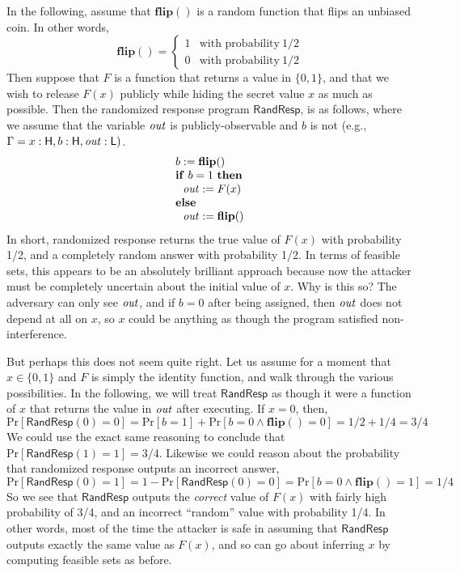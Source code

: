 \documentclass[11pt]{article}
\newcommand{\pr}{\mathrm{Pr}}
\newcommand{\flip}{\mathbf{flip}}
\begin{document}
In the following, assume that $\flip()$ is a random function that flips
an unbiased coin. In other words,
\[
\flip() =
\left\{
\begin{array}{ll}
%
1 & \mbox{with probability}\ 1/2 \\
0 & \mbox{with probability}\ 1/2
\end{array}
\right.
\]
Then suppose that $F$ is a function that returns a value in $\{0,1\}$,
and that we wish to release $F(x)$ publicly while hiding the secret
value $x$ as much as possible. Then the randomized response program
$\mathsf{RandResp}$, is as follows, where we assume that the variable
$\mathit{out}$ is publicly-observable and $b$ is not (e.g., $\Gamma = x : \mathsf{H}, b
: \mathsf{H}, \mathit{out} : \mathsf{L})$.
\[
\begin{array}{l}
%
b := \flip() \\
\mathbf{if}\ b = 1\ \mathbf{then} \\
\ \ \mi{out} := F(x) \\
\mathbf{else} \\
\ \ \mi{out} := \flip()
\end{array}
\]
In short, randomized response returns the true value of $F(x)$ with
probability 1/2, and a completely random answer with probability 1/2. In
terms of feasible sets, this appears to be an absolutely brilliant
approach because now the attacker must be completely uncertain about the
initial value of $x$. Why is this so? The adversary can only see $\mathit{out}$,
and if $b = 0$ after being assigned, then $\mathit{out}$ does not depend at all on
$x$, so $x$ could be anything as though the program satisfied
non-interference.

But perhaps this does not seem quite right. Let us assume for a moment
that $x \in \{0,1\}$ and $F$ is simply the identity function, and walk
through the various possibilities. In the following, we will treat
$\mathsf{RandResp}$ as though it were a function of $x$ that returns the
value in $\mathit{out}$ after executing. If $x = 0$, then,
\[
\pr[\mathsf{RandResp}(0) = 0] = \pr[b = 1] + \pr[b = 0 \land \flip() = 0] = 1/2 + 1/4 = 3/4
\]
We could use the exact same reasoning to conclude that
$\pr[\mathsf{RandResp}(1) = 1] = 3/4$. Likewise we could reason about
the probability that randomized response outputs an incorrect answer,
\[
\pr[\mathsf{RandResp}(0) = 1] = 1 - \pr[\mathsf{RandResp}(0) = 0] = \pr[b = 0 \land \flip() = 1] = 1/4
\]
So we see that $\mathsf{RandResp}$ outputs the \emph{correct} value of
$F(x)$ with fairly high probability of 3/4, and an incorrect ``random''
value with probability 1/4. In other words, most of the time the
attacker is safe in assuming that $\mathsf{RandResp}$ outputs exactly
the same value as $F(x)$, and so can go about inferring $x$ by computing
feasible sets as before.
\end{document}

